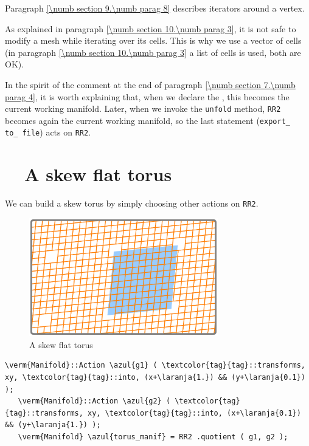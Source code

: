Paragraph \ref{\numb section 9.\numb parag 8} describes iterators around a vertex.

As explained in paragraph \ref{\numb section 10.\numb parag 3}, it is not safe to
modify a mesh while iterating over its cells.
This is why we use a vector of cells (in paragraph \ref{\numb section 10.\numb parag 3}
a list of cells is used, both are OK).

In the spirit of the comment at the end of paragraph \ref{\numb section 7.\numb parag 4},
it is worth explaining that, when we declare the {\small\tt{}}
{\small\tt{}}, this becomes the current working manifold.
Later, when we invoke the {\small\tt unfold} method, {\small\tt RR2} becomes again the current
working manifold, so the last statement ({\small\tt export\_\,to\_\,file}) acts on {\small\tt RR2}.


\section{~~A skew flat torus}\label{\numb section 7.\numb parag 7}

We can build a skew torus by simply choosing other actions on {\small\tt RR2}.

\begin{figure}[ht] \centering
  \includegraphics[width=82mm]{flat-torus-3.eps}
  \caption{A skew flat torus}
  \label{\numb section 7.\numb fig 3}
\end{figure}

\begin{Verbatim}[commandchars=\\\{\},formatcom=\small\tt,frame=single,
   label=parag-\ref{\numb section 7.\numb parag 7}.cpp,rulecolor=\color{moldura},
   baselinestretch=0.94,framesep=2mm                                            ]
   \verm{Manifold}::Action \azul{g1} ( \textcolor{tag}{tag}::transforms, xy, \textcolor{tag}{tag}::into, (x+\laranja{1.}) && (y+\laranja{0.1}) );
   \verm{Manifold}::Action \azul{g2} ( \textcolor{tag}{tag}::transforms, xy, \textcolor{tag}{tag}::into, (x+\laranja{0.1}) && (y+\laranja{1.}) );
   \verm{Manifold} \azul{torus_manif} = RR2 .quotient ( g1, g2 );
\end{Verbatim}

